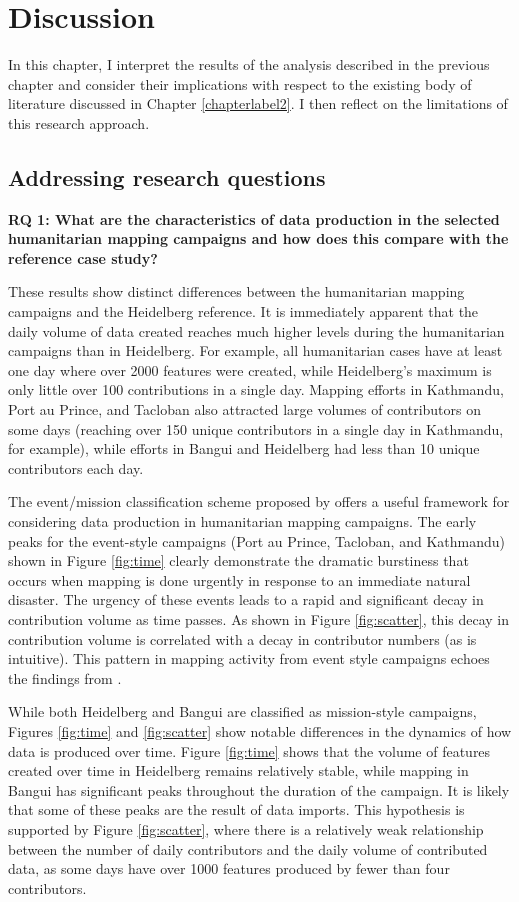 \chapter{Discussion}
\label{chapterlabel6}

In this chapter, I interpret the results of the analysis described in the previous chapter and consider their implications with respect to the existing body of literature discussed in Chapter \ref{chapterlabel2}. I then reflect on the limitations of this research approach. 
\section{Addressing research questions}

\noindent\textbf{RQ 1: What are the characteristics of data production in the selected humanitarian mapping campaigns and how does this compare with the reference case study?} 

These results show distinct differences between the humanitarian mapping campaigns and the Heidelberg reference. It is immediately apparent that the daily volume of data created reaches much higher levels during the humanitarian campaigns than in Heidelberg. For example, all humanitarian cases have at least one day where over 2000 features were created, while Heidelberg's maximum is only little over 100 contributions in a single day. Mapping efforts in Kathmandu, Port au Prince, and Tacloban also attracted large volumes of contributors on some days (reaching over 150 unique contributors in a single day in Kathmandu, for example), while efforts in Bangui and Heidelberg had less than 10 unique contributors each day. 

The event/mission classification scheme proposed by \textcite{dittus_mass_2017} offers a useful framework for considering data production in humanitarian mapping campaigns. The early peaks for the event-style campaigns (Port au Prince, Tacloban, and Kathmandu) shown in Figure \ref{fig:time} clearly demonstrate the dramatic burstiness that occurs when mapping is done urgently in response to an immediate natural disaster. The urgency of these events leads to a rapid and significant decay in contribution volume as time passes. As shown in Figure \ref{fig:scatter}, this decay in contribution volume is correlated with a decay in contributor numbers (as is intuitive). This pattern in mapping activity from event style campaigns echoes the findings from \textcite[p. 1294]{dittus_mass_2017}.

While both Heidelberg and Bangui are classified as mission-style campaigns, Figures \ref{fig:time} and \ref{fig:scatter} show notable differences in the dynamics of how data is produced over time. Figure \ref{fig:time} shows that the volume of features created over time in Heidelberg remains relatively stable, while mapping in Bangui has significant peaks throughout the duration of the campaign. It is likely that some of these peaks are the result of data imports. This hypothesis is supported by Figure \ref{fig:scatter}, where there is a relatively weak relationship between the number of daily contributors and the daily volume of contributed data, as some days have over 1000 features produced by fewer than four contributors. 

